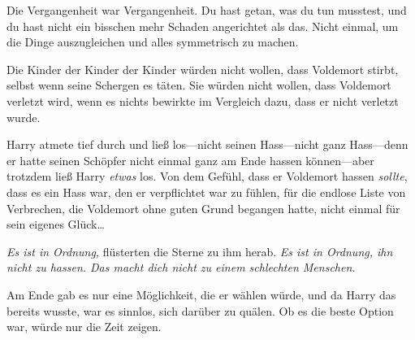 Die Vergangenheit war Vergangenheit.
Du hast getan, was du tun musstest, und du hast nicht ein bisschen mehr Schaden angerichtet als das. Nicht einmal, um die Dinge auszugleichen und alles symmetrisch zu machen.

Die Kinder der Kinder der Kinder würden nicht wollen, dass Voldemort stirbt, selbst wenn seine Schergen es täten.
Sie würden nicht wollen, dass Voldemort verletzt wird, wenn es nichts bewirkte im Vergleich dazu, dass er nicht verletzt wurde.

Harry atmete tief durch und ließ los—nicht seinen Hass—nicht ganz Hass—denn er hatte seinen Schöpfer nicht einmal ganz am Ende hassen können—aber trotzdem ließ Harry \emph{etwas} los. Von dem Gefühl, dass er Voldemort hassen \emph{sollte}, dass es ein Hass war, den er verpflichtet war zu fühlen, für die endlose Liste von Verbrechen, die Voldemort ohne guten Grund begangen hatte, nicht einmal für sein eigenes Glück…

\emph{Es ist in Ordnung,} flüsterten die Sterne zu ihm herab. \emph{Es ist in Ordnung, ihn nicht zu hassen. Das macht dich nicht zu einem schlechten Menschen.}

Am Ende gab es nur eine Möglichkeit, die er wählen würde, und da Harry das bereits wusste, war es sinnlos, sich darüber zu quälen. Ob es die beste Option war, würde nur die Zeit zeigen.


